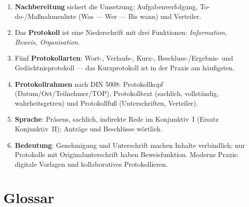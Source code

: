 \documentclass[11pt, a4paper]{article}
\begin{document}
\begin{enumerate}
  \item \textbf{Nachbereitung} sichert die Umsetzung: Aufgabenverfolgung, To-do-/Maßnahmenliste (Was --- Wer --- Bis wann) und Verteiler.
  \item Das \textbf{Protokoll} ist eine Niederschrift mit drei Funktionen: \emph{Information, Beweis, Organisation}.
  \item Fünf \textbf{Protokollarten}: Wort-, Verlaufs-, Kurz-, Beschluss-/Ergebnis- und Gedächtnisprotokoll --- das Kurzprotokoll ist in der Praxis am häufigsten.
  \item \textbf{Protokollrahmen} nach DIN 5008: Protokollkopf (Datum/Ort/Teilnehmer/TOP), Protokolltext (sachlich, vollständig, wahrheitsgetreu) und Protokollfuß (Unterschriften, Verteiler).
  \item \textbf{Sprache}: Präsens, sachlich, indirekte Rede im Konjunktiv~I (Ersatz Konjunktiv~II); Anträge und Beschlüsse wörtlich.
  \item \textbf{Bedeutung}: Genehmigung und Unterschrift machen Inhalte verbindlich; nur Protokolle mit Originalunterschrift haben Beweisfunktion. Moderne Praxis: digitale Vorlagen und kollaboratives Protokollieren.
\end{enumerate}

\newpage

\section*{Glossar}






\end{document}
